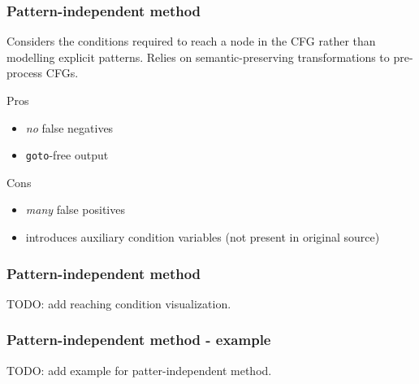 \documentclass[aspectratio=1610]{beamer}
\begin{document}

\begin{frame}
	\frametitle{Pattern-independent method}

	Considers the conditions required to reach a node in the CFG rather than modelling explicit patterns. Relies on semantic-preserving transformations to pre-process CFGs.

	\vspace*{2em}

	\begin{block}{Pros}
		\begin{itemize}
			\item \textit{no} false negatives
			\item \texttt{goto}-free output
		\end{itemize}
	\end{block}

	\begin{block}{Cons}
		\begin{itemize}
			\item \textit{many} false positives
			\item introduces auxiliary condition variables (not present in original source)
		\end{itemize}
	\end{block}




\end{frame}

\begin{frame}
	\frametitle{Pattern-independent method}
	TODO: add reaching condition visualization.

\end{frame}


\begin{frame}
	\frametitle{Pattern-independent method - example}

	TODO: add example for patter-independent method.
\end{frame}
\end{document}
